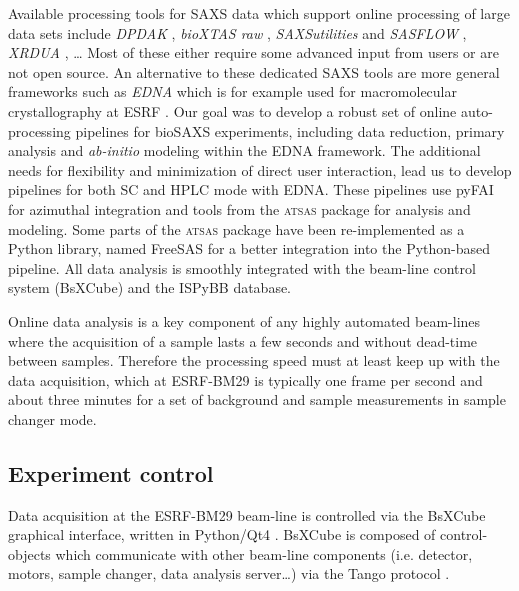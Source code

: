 \documentclass[preprint,pdf]{iucr}              %
\begin{document}
Available processing tools for SAXS data which support online processing of
large data sets include \textit{DPDAK} \cite{DPDAK}, \textit{bioXTAS raw}
\cite{BioXTASraw}, \textit{SAXSutilities} \cite{SAXSUtilities} and
\textit{SASFLOW} \cite{X33P,P12},  \textit{XRDUA} \cite{xrdua}, \ldots 
Most of these either require some advanced input from users or are not open source.  
An alternative to these dedicated SAXS tools are more general frameworks such as
\textit{EDNA} which is for example used for macromolecular crystallography at
ESRF \cite{EDNA}. 
Our goal was to develop a robust set of online auto-processing pipelines
for bioSAXS experiments, including data reduction, primary analysis and
\textit{ab-initio} modeling  within the EDNA framework. 
The additional needs for flexibility and minimization of
direct user interaction, lead us to develop pipelines for both SC and HPLC mode with EDNA.
These pipelines use pyFAI for azimuthal integration \cite{pyFAI} and tools
from the \textsc{atsas} package \cite{ATSAS1,ATSAS2} for analysis and modeling.
Some parts of the \textsc{atsas} package have been re-implemented as a Python
library, named FreeSAS \cite{freesas} for a better integration into the
Python-based pipeline.
All data analysis is smoothly integrated with the beam-line control system
(BsXCube) and the ISPyBB \cite{ISPYBB} database.

Online data analysis is a key component of any highly automated beam-lines
where the acquisition of a sample lasts a few seconds and without dead-time between samples.
Therefore the processing speed must at least keep up with the data acquisition, which
at ESRF-BM29 is typically one frame per second and about three minutes for a set
of background and sample measurements in sample changer mode.


\subsection{Experiment control}
Data acquisition at the ESRF-BM29 beam-line is controlled via the BsXCube
graphical interface, written in Python/Qt4 \cite{pyqt}.
BsXCube is composed of control-objects which communicate with other beam-line
components (i.e. detector, motors, sample changer, data analysis server\ldots)
via the Tango protocol \cite{tango}.

\end{document}
